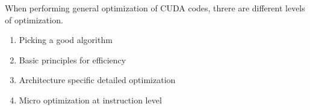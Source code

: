 When performing general optimization of CUDA codes, threre are different levels of optimization.
\begin{enumerate}
	\item Picking a good algorithm
	\item Basic principles for efficiency
	\item Architecture specific detailed optimization
	\item Micro optimization at instruction level
\end{enumerate}